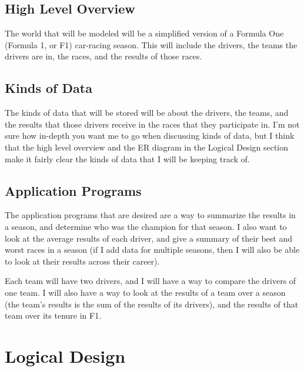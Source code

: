 \documentclass{article} %
\begin{document}
\subsection{High Level Overview}
The world that will be modeled will be a simplified version of a Formula
One (Formula 1, or F1) car-racing season. This will include the drivers, the teams the
drivers are in, the races, and the results of those races. 

\subsection{Kinds of Data}
The kinds of data that will be stored will be about the drivers, the
teams, and the results that those drivers receive in the races that they
participate in. I'm not sure how in-depth you want me to go when
discussing kinds of data, but I think that the high level overview and
the ER diagram in the Logical Design section make it fairly clear the
kinds of data that I will be keeping track of. 

\subsection{Application Programs}
The application programs that are desired are a way to summarize the
results in a season, and determine who was the champion for that season.
I also want to look at the average results of each driver, and give a
summary of their best and worst races in a season (if I add data for
multiple seasons, then I will also be able to look at their results
across their career).

Each team will have two drivers, and I will have a way to compare the
drivers of one team. I will also have a way to look at the results of a
team over a season (the team's results is the sum of the results of its
drivers), and the results of that team over its tenure in F1.


\section{Logical Design}
\end{document}
